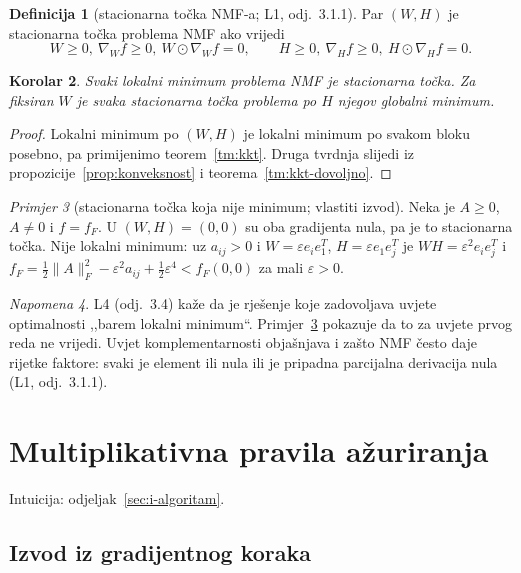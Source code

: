 \documentclass[11pt,a4paper]{article}
\theoremstyle{definition}
\newtheorem{definicija}{Definicija}[section]
\theoremstyle{plain}
\newtheorem{korolar}[definicija]{Korolar}
\theoremstyle{remark}
\newtheorem{napomena}[definicija]{Napomena}
\newtheorem{primjer}[definicija]{Primjer}
\newcommand{\intuicija}[1]{{\small\color{muted}\sffamily Intuicija: odjeljak~\ref{#1}.}\par}
\begin{document}
\begin{definicija}[stacionarna točka NMF-a; L1, odj.~3.1.1]
Par $(W,H)$ je stacionarna točka problema NMF ako vrijedi
\[
  W\geq0,\ \nabla_Wf\geq0,\ W\odot\nabla_Wf=0,\qquad
  H\geq0,\ \nabla_Hf\geq0,\ H\odot\nabla_Hf=0.
\]
\end{definicija}

\begin{korolar}
Svaki lokalni minimum problema NMF je stacionarna točka. Za fiksiran $W$ je svaka stacionarna
točka problema po $H$ njegov globalni minimum.
\end{korolar}
\begin{proof}
Lokalni minimum po $(W,H)$ je lokalni minimum po svakom bloku posebno, pa primijenimo
teorem~\ref{tm:kkt}. Druga tvrdnja slijedi iz propozicije~\ref{prop:konveksnost} i
teorema~\ref{tm:kkt-dovoljno}.
\end{proof}

\begin{primjer}[stacionarna točka koja nije minimum; vlastiti izvod]\label{pr:nula-stacionarna}
Neka je $A\geq0$, $A\neq0$ i $f=f_F$. U $(W,H)=(0,0)$ su oba gradijenta nula, pa je to stacionarna
točka. Nije lokalni minimum: uz $a_{ij}>0$ i $W=\varepsilon e_ie_1^T$, $H=\varepsilon e_1e_j^T$ je
$WH=\varepsilon^2e_ie_j^T$ i $f_F=\frac12\|A\|_F^2-\varepsilon^2a_{ij}+\frac12\varepsilon^4<f_F(0,0)$
za mali $\varepsilon>0$.
\end{primjer}

\begin{napomena}
L4 (odj.~3.4) kaže da je rješenje koje zadovoljava uvjete optimalnosti ,,barem lokalni minimum``.
Primjer~\ref{pr:nula-stacionarna} pokazuje da to za uvjete prvog reda ne vrijedi. Uvjet
komplementarnosti objašnjava i zašto NMF često daje rijetke faktore: svaki je element ili nula ili
je pripadna parcijalna derivacija nula (L1, odj.~3.1.1).
\end{napomena}

\section{Multiplikativna pravila ažuriranja}\label{sec:f-mu}
\intuicija{sec:i-algoritam}

\subsection{Izvod iz gradijentnog koraka}
\end{document}
